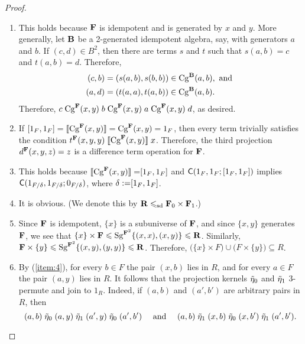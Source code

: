 \begin{proof}\
  \begin{enumerate}
  \item 
  This holds because $\mathbf{F}$ is idempotent and is generated by $x$ and $y$.
  More generally, let $\mathbf{B}$ be a 2-generated idempotent algebra, say, with
  generators $a$ and $b$.  If $(c,d) \in B^2$, then there are terms $s$ and $t$
  such that $s(a,b) = c$ and $t(a,b) = d$.  Therefore, 
  \begin{align*}
    (c,b) &= (s(a,b), s(b,b)) \in \operatorname{Cg}^{\mathbf{B}}(a,b), \text{ and }\\
    (a,d) &= (t(a,a), t(a,b)) \in \operatorname{Cg}^{\mathbf{B}}(a,b).
  \end{align*}
  Therefore, 
  $c \mathrel{\operatorname{Cg}^{\mathbf{F}}(x,y)} b\mathrel{\operatorname{Cg}^{\mathbf{F}}(x,y)} a \mathrel{\operatorname{Cg}^{\mathbf{F}}(x,y)} d$,
  as desired.

  \item If $[1_F,1_F] = \llbracket \operatorname{Cg}^{\mathbf{F}}(x,y) \rrbracket = \operatorname{Cg}^{\mathbf{F}}(x,y) = 1_F$, then every term
  trivially satisfies the condition
  $t^{\mathbf{F}}(x,y,y) \mathrel{\llbracket \operatorname{Cg}^{\mathbf{F}}(x,y) \rrbracket} x$.  Therefore, the third projection
  $d^{\mathbf{F}}(x,y,z) = z$ is a difference term operation for $\mathbf{F}$.

\item  This holds because %
  $\llbracket \operatorname{Cg}^{\mathbf{F}}(x,y) \rrbracket = \mathrel{[1_F, 1_F]}$ and $\mathsf{C}(1_F, 1_F; \mathrel{[1_F, 1_F]})$
  implies $\mathsf{C}(1_{F/\delta}, 1_{F/\delta}; 0_{F/\delta})$, where
  $\delta := \mathrel{[1_F, 1_F]}$.

\item It is obvious. 
(We denote this by $\mathbf{R} \leqslant_{\mathrm{sd}} \mathbf{F}_0 \times \mathbf{F}_1$.)


\item
  Since $\mathbf{F}$ is idempotent, $\{x\}$ is a subuniverse of $\mathbf{F}$, and since
  $\{x, y\}$ generates $\mathbf{F}$, we see that
  $\{x\} \times \mathbf{F} \leqslant \operatorname{Sg}^{\mathbf{F}^2}\{(x,x), (x,y)\}\leqslant \mathbf{R}$.
  Similarly, $\mathbf{F}\times \{y\} \leqslant \operatorname{Sg}^{\mathbf{F}^2}\{(x,y), (y,y)\}\leqslant \mathbf{R}$.
  Therefore,
  $\bigl(\{x\} \times F\bigr) \cup \bigl(F \times \{y\}\bigr) \subseteq R$.


\item By (\ref{item:4}), for every $b \in F$ the pair $(x,b)$ lies in $R$, and for every
  $a\in F$ the pair $(a,y)$ lies in $R$.
  It follows that the projection kernels $\tilde{\eta}_0$ and $\tilde{\eta}_1$ 3-permute and
  join to $1_R$.
  Indeed, if $(a,b)$ and $(a',b')$ are arbitrary pairs in $R$, then
  \[ (a,b) \mathrel{\tilde{\eta}_0} (a,y) \mathrel{\tilde{\eta}_1} (a',y) \mathrel{\tilde{\eta}_0}
    (a',b') \quad \text{ and } \quad 
  (a,b) \mathrel{\tilde{\eta}_1} (x,b) \mathrel{\tilde{\eta}_0} (x,b') \mathrel{\tilde{\eta}_1} (a',b'). \]
  \end{enumerate}
\end{proof}

